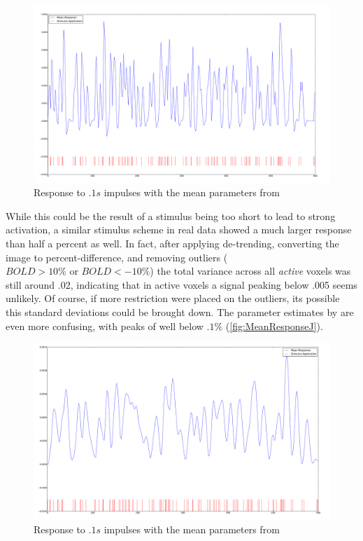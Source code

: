 \begin{figure}
\centering
\label{fig:MeanResponseF}
\includegraphics[trim=6cm 3cm 6cm 3cm,width=16cm]{images/mean_response}
\caption{Response to $.1s$ impulses with the mean parameters from \cite{Friston2000}}
\end{figure}

While this could be the result of a stimulus
being too short to lead to strong activation, a similar stimulus
scheme in real data showed a much larger response than 
half a percent as well. In fact, after applying de-trending,
converting the image to percent-difference, and removing 
outliers ($ BOLD > 10\% \text{ or } BOLD < -10\%$) the total variance
across all \emph{active} voxels was still around .02, indicating
that in active voxels a signal peaking below .005 seems unlikely. 
Of course, if more restriction were placed on the outliers, its possible
this standard deviations could be brought down. 
The parameter estimates by \cite{Johnston2008} are even more 
confusing, with peaks of well below $.1\%$ (\autoref{fig:MeanResponseJ}).

\begin{figure}
\centering
\label{fig:MeanResponseJ}
\includegraphics[trim=6cm 3cm 6cm 3cm,width=16cm]{images/mean_response_johnston}
\caption{Response to $.1s$ impulses with the mean parameters from \cite{Johnston2008}}
\end{figure}

